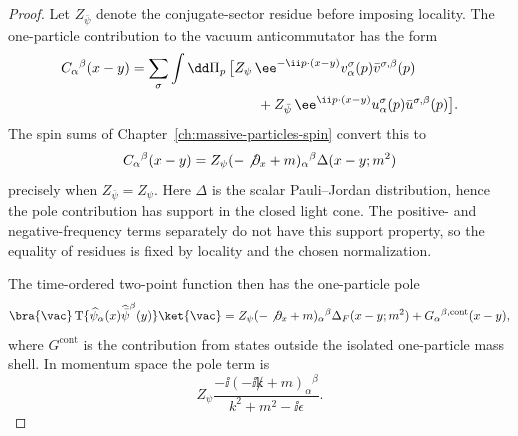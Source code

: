 \begin{proof}
Let \(Z_{\bar\psi}\) denote the conjugate-sector residue before imposing
locality.  The one-particle contribution to the vacuum anticommutator has the
form
\[
\begin{aligned}
  C_\alpha{}^\beta(x-y)
  &=
  \sum_\sigma\int\dd\Pi_p\,
  \bigl[
    Z_\psi\,
    \ee^{-\ii p\cdot(x-y)}
    v_\alpha^\sigma(p)\bar v^{\sigma,\beta}(p)  \\
  &\hspace{3.2cm}
    +
    Z_{\bar\psi}\,
    \ee^{\ii p\cdot(x-y)}
    u_\alpha^\sigma(p)\bar u^{\sigma,\beta}(p)
  \bigr].
\end{aligned}
\]
The spin sums of Chapter~\ref{ch:massive-particles-spin} convert this to
\[
  C_\alpha{}^\beta(x-y)
  =
  Z_\psi(-\not\partial_x+m)_\alpha{}^\beta
  \Delta(x-y;m^2)
\]
precisely when \(Z_{\bar\psi}=Z_\psi\). Here \(\Delta\) is the scalar
Pauli--Jordan distribution, hence the pole contribution has support in the
closed light cone. The positive- and negative-frequency terms separately do
not have this support property, so the equality of residues is fixed by
locality and the chosen normalization.

The time-ordered two-point function then has the one-particle pole
\[
  \bra{\vac}
  \operatorname T\{
    \widehat\psi_\alpha(x)\widehat{\bar\psi}^{\beta}(y)
  \}
  \ket{\vac}
  =
  Z_\psi
  (-\not\partial_x+m)_\alpha{}^\beta
  \Delta_F(x-y;m^2)
  +
  G_{\alpha}{}^{\beta,\mathrm{cont}}(x-y),
\]
where \(G^{\mathrm{cont}}\) is the contribution from states outside the
isolated one-particle mass shell. In momentum space the pole term is
\[
  Z_\psi
  \frac{-\ii(-\ii\not k+m)_\alpha{}^\beta}
       {k^2+m^2-\ii\epsilon}.
\]
\end{proof}

